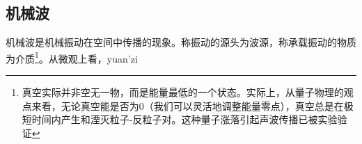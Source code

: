 
\subsection{机械波}
机械波是机械振动在空间中传播的现象。称振动的源头为波源，称承载振动的物质为介质\footnote{真空实际并非空无一物，而是能量最低的一个状态。实际上，从量子物理的观点来看，无论真空能是否为0（我们可以灵活地调整能量零点），真空总是在极短时间内产生和湮灭粒子-反粒子对。这种量子涨落引起声波传播已被实验验证}。从微观上看，yuan'zi
